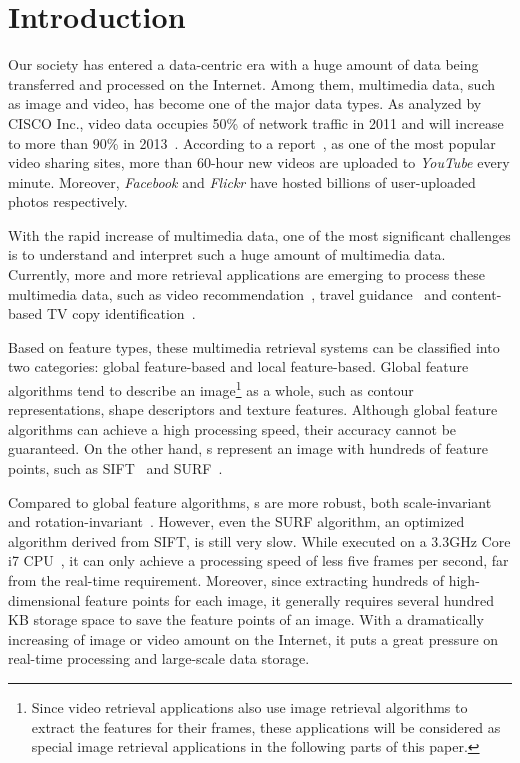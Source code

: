 \section{Introduction}
\label{sec:introduction}

Our society has entered a data-centric era with a huge amount of data being transferred and processed on the Internet. Among them, multimedia data, such as image and video, has become one of the major data types. As analyzed by CISCO Inc., video data occupies 50\% of network traffic in 2011 and will increase to more than 90\% in 2013~\cite{index2010forecast}. According to a report~\cite{jansohn2009detecting}, as one of the most popular video sharing sites, more than 60-hour new videos are uploaded to \emph{YouTube} every minute. Moreover, \emph{Facebook} and \emph{Flickr} have hosted billions of user-uploaded photos respectively.

With the rapid increase of multimedia data, one of the most significant challenges is to understand and interpret such a huge amount of multimedia data. Currently, more and more retrieval applications are emerging to process these multimedia data, such as video recommendation~\cite{yang2007online}, travel guidance~\cite{gao2010w2go} and content-based TV copy identification~\cite{joly2003robust}. 

Based on feature types, these multimedia retrieval systems can be classified into two categories: global feature-based and local feature-based. Global feature algorithms tend to describe an image\footnote{Since video retrieval applications also use image retrieval algorithms to extract the features for their frames, these applications will be considered as special image retrieval applications in the following parts of this paper.} as a whole, such as contour representations, shape descriptors and texture features. Although global feature algorithms can achieve a high processing speed, their accuracy cannot be guaranteed. On the other hand, {\lfea}s represent  an image with hundreds of feature points, such as SIFT~\cite{lowe1999object,lowe2004distinctive} and SURF~\cite{bay2006surf,evans2009notes}. 

Compared to global feature algorithms, {\lfea}s are more robust, both scale-invariant and rotation-invariant~\cite{mikolajczyk2005performance}\cite{bauer2007comparing}. However, even the SURF algorithm, an optimized algorithm derived from SIFT, is still very slow. While executed on a 3.3GHz Core i7 CPU~\cite{adaptivepipelineicpp2012}, it can only achieve a processing speed of less five frames per second, far from the real-time requirement. Moreover, since extracting hundreds of high-dimensional feature points for each image, it generally requires several hundred KB storage space to save the feature points of an image. With a dramatically increasing of image or video amount on the Internet, it puts a great pressure on real-time processing and large-scale data storage.

